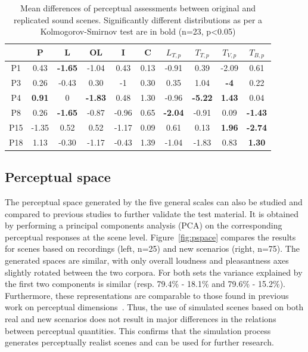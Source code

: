 \documentclass[11pt,a4paper]{article}
\begin{document}
\begin{table}[h]
\centering
\caption{Mean differences of perceptual assessments between original and replicated sound scenes. Significantly different distributions as per a Kolmogorov-Smirnov test are in bold (n=23, p<0.05)}
\label{tab:ogrep}
\begin{tabular}{ c | c c c c c c c c c }
\hline
	 & P & L & OL & I & C & $L_{T, p}$ & $T_{T, p}$ & $T_{V, p}$ & $T_{B, p}$ \\ \hline
	P1 & 0.43 & \textbf{-1.65} & -1.04 & 0.43 & 0.13 & -0.91 & 0.39 & -2.09 & 0.61 \\
	P3 & 0.26 & -0.43 & 0.30 & -1 & 0.30 & 0.35 & 1.04 & \textbf{-4} & 0.22 \\
	P4 & \textbf{0.91} & 0 & \textbf{-1.83} & 0.48 & 1.30 & -0.96 & \textbf{-5.22} & \textbf{1.43} & 0.04 \\
	P8 & 0.26 & \textbf{-1.65} & -0.87 & -0.96 & 0.65 & \textbf{-2.04} & -0.91 & 0.09 & \textbf{-1.43} \\
	P15 & -1.35 & 0.52 & 0.52 & -1.17 & 0.09 & 0.61 & 0.13 & \textbf{1.96} & \textbf{-2.74} \\
	P18 & 1.13 & -0.30 & -1.17 & -0.43 & 1.39 & -1.04 & -1.83 & 0.83 & \textbf{1.30} \\ \hline
\end{tabular}
\end{table}



\subsection{Perceptual space}

The perceptual space generated by the five general scales can also be studied and compared to previous studies to further validate the test material. It is obtained by performing a principal components analysis (PCA) on the corresponding perceptual responses at the scene level. Figure~\ref{fig:pspace} compares the results for scenes based on recordings (left, n=25) and new scenarios (right, n=75). The generated spaces are similar, with only overall loudness and pleasantness axes slightly rotated between the two corpora. For both sets the variance explained by the first two components is similar (resp. 79.4\% - 18.1\% and 79.6\% - 15.2\%). Furthermore, these representations are comparable to those found in previous work on perceptual dimensions~\cite{axelsson}. Thus, the use of simulated scenes based on both real and new scenarios does not result in major differences in the relations between perceptual quantities. This confirms that the simulation process generates perceptually realist scenes and can be used for further research.\\
\end{document}
